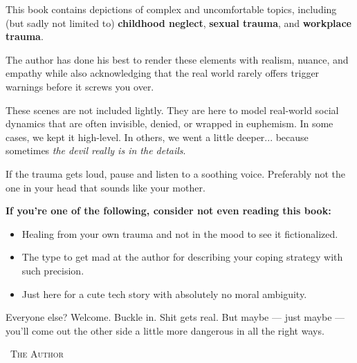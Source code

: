 \begin{tcolorbox}[
  enhanced,
  breakable,
  colback=white,
  colframe=red!70!black,
  coltitle=black,
  boxrule=1pt,
  arc=2mm,
  left=8mm,
  right=8mm,
  top=5mm,
  bottom=5mm,
  sharp corners=south,
  fonttitle=\LARGE\bfseries\sffamily,
  fontupper=\large\sffamily,
  title=\faExclamationTriangle\quad CONTENT WARNING: THIS BOOK MAY HURT (A LITTLE)
]

\bigskip

This book contains depictions of complex and uncomfortable topics, including (but sadly 
not limited to) \textbf{childhood neglect}, \textbf{sexual trauma}, and \textbf{workplace 
trauma}. 

\medskip

The author has done his best to render these elements with realism, nuance, and empathy
while also acknowledging that the real world rarely offers trigger warnings before 
it screws you over.

\medskip

These scenes are not included lightly. They are here to model real-world social dynamics 
that are often 
invisible, denied, or wrapped in euphemism. In some cases, we kept it high-level. In others, 
we went a little deeper... because sometimes \textit{the devil really is in the details}.

\medskip

If the trauma gets loud, pause and listen to a soothing voice. Preferably not the one in 
your head that sounds like your mother.

\medskip

\textbf{\large If you’re one of the following, consider not even reading this book:}

\begin{itemize}
  \item Healing from your own trauma and not in the mood to see it fictionalized.
  \item The type to get mad at the author for describing your coping strategy with such precision.
  \item Just here for a cute tech story with absolutely no moral ambiguity.
\end{itemize}

\medskip

Everyone else? Welcome. Buckle in. Shit gets real. But maybe --- just maybe --- you’ll come 
out the other side a little more dangerous in all the right ways.

\bigskip

\hfill\textemdash\ \textsc{The Author}

\end{tcolorbox}
